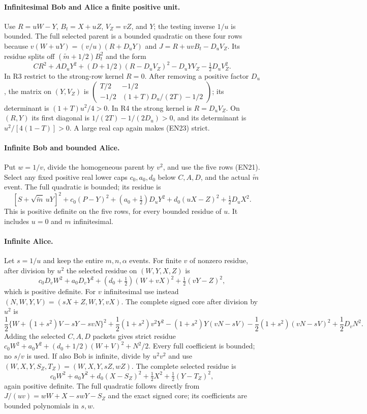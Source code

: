 \paragraph{Infinitesimal Bob and Alice a finite positive unit.}
Use $R=uW-Y$, $B_t=X+uZ$, $V_Z=vZ$, and $Y$; the testing inverse
$1/u$ is bounded. The full selected parent is a bounded quadratic
on these four rows because
$v(W+uY)=(v/u)(R+D_uY)$ and
$J=R+uvB_t-D_uV_Z$.
Its residue splits off $(\widetilde m+1/2)B_t^2$ and the form
\[
CR^2+AD_uY^2+(D+1/2)(R-D_uV_Z)^2
-D_uYV_Z-\tfrac12D_uV_Z^2.                            \tag{EN23}
\]
In R3 restrict to the strong-row kernel $R=0$.
After removing a positive factor $D_u$, the matrix on $(Y,V_Z)$ is
$\left(\begin{smallmatrix}T/2&-1/2\\-1/2&
(1+T)D_u/(2T)-1/2\end{smallmatrix}\right)$;
its determinant is $(1+T)u^2/4>0$.
In R4 the strong kernel is $R=D_uV_Z$.
On $(R,Y)$ its first diagonal is $1/(2T)-1/(2D_u)>0$,
and its determinant is $u^2/[4(1-T)]>0$.
A large real cap again makes (EN23) strict.

\paragraph{Infinite Bob and bounded Alice.}
Put $w=1/v$, divide the homogeneous parent by $v^2$, and use
the five rows (EN21). Select any fixed positive real lower caps
$c_0,a_0,d_0$ below $C,A,D$, and the actual $\widetilde m$ event.
The full quadratic is bounded; its residue is
\[
[S+\sqrt{\widetilde m}\,uY]^2+
c_0(P-Y)^2+(a_0+\tfrac12)D_uY^2+
d_0(uX-Z)^2+\tfrac12D_uX^2.                           \tag{EN24}
\]
This is positive definite on the five rows, for every bounded
residue of $u$. It includes $u=0$ and $m$ infinitesimal.

\paragraph{Infinite Alice.}
Let $s=1/u$ and keep the entire $m,n,\alpha$ events.
For finite $v$ of nonzero residue, after division by $u^2$
the selected residue on $(W,Y,X,Z)$ is
\[
c_0D_vW^2+a_0D_vY^2+
(d_0+\tfrac12)(W+vX)^2+\tfrac12(vY-Z)^2,
\]
which is positive definite. For $v$ infinitesimal use instead
$(N,W,Y,V)=(sX+Z,W,Y,vX)$.
The complete signed core after division by $u^2$ is
\[
\frac12\{W+(1+s^2)V-sY-svN\}^2
+\frac12(1+s^2)v^2Y^2
-(1+s^2)Y(vN-sV)-\frac12(1+s^2)(vN-sV)^2
+\frac12D_vN^2 .
\]
Adding the selected $C,A,D$ packets gives strict residue
$c_0W^2+a_0Y^2+(d_0+1/2)(W+V)^2+N^2/2$.
Every full coefficient is bounded; no $s/v$ is used.
If also Bob is infinite, divide by $u^2v^2$ and use
$(W,X,Y,S_Z,T_Z)=(W,X,Y,sZ,wZ)$.
The complete selected residue is
\[
c_0W^2+a_0Y^2+d_0(X-S_Z)^2+\tfrac12X^2
+\tfrac12(Y-T_Z)^2,                                   \tag{EN25}
\]
again positive definite. The full quadratic follows directly from
$J/(uv)=wW+X-swY-S_Z$ and the exact signed core;
its coefficients are bounded polynomials in $s,w$.

